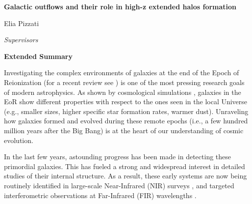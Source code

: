 \documentclass[a4paper, 12pt]{article}
\begin{document}
\begin{center}
\vspace{3cm}
    \textbf{{\Large
    Galactic outflows and their role in high-z extended halos formation}
    }    
    
    \vspace{0.5cm}
    \large
    Elia Pizzati
    \vspace{0.5cm}
    
\textit{Supervisors}

\end{center}        


    \begin{multicols}{2}

    \hspace{15mm}{\large Prof. Andrea Ferrara}
    
        \columnbreak
        
    \hspace{10mm}{\large Dr. Andrea Pallottini}
    
    \end{multicols}

       
    \vspace{0.3cm}
\begin{center}
    \textbf{{Extended Summary}}
\end{center}

Investigating the complex environments of galaxies at the end of the Epoch of Reionization (for a recent review see \cite{Dayal:2018hft}) is one of the most pressing research goals of modern astrophysics. As shown by cosmological simulations \citep{fire2, Vogelsberger:2019ynw, sphinx, Pallottini22}, galaxies in the EoR show different properties with respect to the ones seen in the local Universe (e.g., smaller sizes, higher specific star formation rates, warmer dust). Unraveling how galaxies formed and evolved during these remote epochs (i.e., a few hundred million years after the Big Bang) is at the heart of our understanding of cosmic evolution.

In the last few years, astounding progress has been made in detecting these primordial galaxies. This has fueled a strong and widespread interest in detailed studies of their internal structure. As a result, these early systems are now being routinely identified in large-scale Near-Infrared (NIR) surveys  \citep{refId0, bouwens_15}, and targeted interferometric observations at Far-Infrared (FIR) wavelengths \citep{Fevre:2019thf, bouwens_rebels}.
\end{document}
